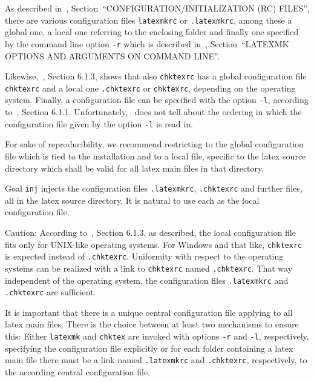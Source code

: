 As described in~\cite{LatexMk23}, 
Section~``CONFIGURATION/INITIALIZATION (RC) FILES'', 
there are various configuration files \texttt{latexmkrc} or \texttt{.latexmkrc}, 
among these a global one, a local one referring to the enclosing folder 
and finally one specified by the command line option \texttt{-r} 
which is described in~\cite{LatexMk23}, 
Section~``LATEXMK OPTIONS AND ARGUMENTS ON COMMAND LINE''. 

Likewise,~\cite{ChkTeX22}, Section 6.1.3, shows that also \texttt{chktexrc} 
has a global configuration file \texttt{chktexrc} 
and a local one \texttt{.chktexrc} or \texttt{chktexrc}, 
depending on the operating system. 
Finally, a configuration file can be specified with the option \texttt{-l}, 
according to~\cite{ChkTeX22}, Section 6.1.1. 
Unfortunately,~\cite{ChkTeX22} does not tell about the ordering 
in which the configuration file given by the option \texttt{-l} is read in. 

For sake of reproducibility, we recommend restricting to the global configuration file 
which is tied to the installation and to a local file, specific to the latex source directory 
which shall be valid for all latex main files in that directory. 

Goal \texttt{inj} injects the configuration files \texttt{.latexmkrc}, \texttt{.chktexrc} 
and further files, 
all in the latex source directory. 
It is natural to use each as the local configuration file. 

Caution: According to~\cite{ChkTeX22}, Section 6.1.3, 
as described, the local configuration file fits only for UNIX-like operating systems. 
For Windows and that like, \texttt{chktexrc} is expected instead of \texttt{.chktexrc}. 
Uniformity with respect to the operating systems can be realized 
with a link to \texttt{chktexrc} named \texttt{.chktexrc}. 
That way independent of the operating system, 
the configuration files \texttt{.latexmkrc} and \texttt{.chktexrc} are sufficient. 

It is important that there is a unique central configuration file 
applying to all latex main files. 
There is the choice between at least two mechanisms to ensure this: 
Either \texttt{latexmk} and \texttt{chktex} 
are invoked with options \texttt{-r} and \texttt{-l}, respectively, 
specifying the configuration file explicitly 
or for each folder containing a latex main file 
there must be a link named \texttt{.latexmkrc} and \texttt{.chktexrc}, respectively, 
to the according central configuration file. 

